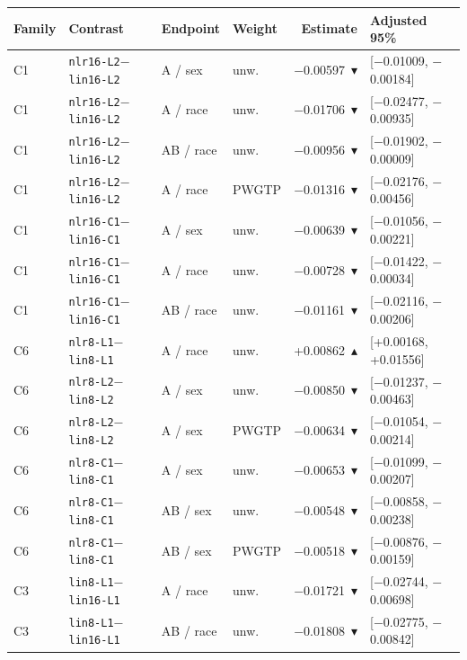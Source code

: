 \begin{tabular}{@{}llllrl@{}}
\toprule
Family & Contrast & Endpoint & Weight & Estimate & Adjusted 95\% \\
\midrule
C1 & \texttt{nlr16-L2}$-$\texttt{lin16-L2} & A / sex & unw. & $-$0.00597~$\blacktriangledown$ & [$-$0.01009, $-$0.00184] \\
C1 & \texttt{nlr16-L2}$-$\texttt{lin16-L2} & A / race & unw. & $-$0.01706~$\blacktriangledown$ & [$-$0.02477, $-$0.00935] \\
C1 & \texttt{nlr16-L2}$-$\texttt{lin16-L2} & AB / race & unw. & $-$0.00956~$\blacktriangledown$ & [$-$0.01902, $-$0.00009] \\
C1 & \texttt{nlr16-L2}$-$\texttt{lin16-L2} & A / race & PWGTP & $-$0.01316~$\blacktriangledown$ & [$-$0.02176, $-$0.00456] \\
C1 & \texttt{nlr16-C1}$-$\texttt{lin16-C1} & A / sex & unw. & $-$0.00639~$\blacktriangledown$ & [$-$0.01056, $-$0.00221] \\
C1 & \texttt{nlr16-C1}$-$\texttt{lin16-C1} & A / race & unw. & $-$0.00728~$\blacktriangledown$ & [$-$0.01422, $-$0.00034] \\
C1 & \texttt{nlr16-C1}$-$\texttt{lin16-C1} & AB / race & unw. & $-$0.01161~$\blacktriangledown$ & [$-$0.02116, $-$0.00206] \\
C6 & \texttt{nlr8-L1}$-$\texttt{lin8-L1} & A / race & unw. & +0.00862~$\blacktriangle$ & [+0.00168, +0.01556] \\
C6 & \texttt{nlr8-L2}$-$\texttt{lin8-L2} & A / sex & unw. & $-$0.00850~$\blacktriangledown$ & [$-$0.01237, $-$0.00463] \\
C6 & \texttt{nlr8-L2}$-$\texttt{lin8-L2} & A / sex & PWGTP & $-$0.00634~$\blacktriangledown$ & [$-$0.01054, $-$0.00214] \\
C6 & \texttt{nlr8-C1}$-$\texttt{lin8-C1} & A / sex & unw. & $-$0.00653~$\blacktriangledown$ & [$-$0.01099, $-$0.00207] \\
C6 & \texttt{nlr8-C1}$-$\texttt{lin8-C1} & AB / sex & unw. & $-$0.00548~$\blacktriangledown$ & [$-$0.00858, $-$0.00238] \\
C6 & \texttt{nlr8-C1}$-$\texttt{lin8-C1} & AB / sex & PWGTP & $-$0.00518~$\blacktriangledown$ & [$-$0.00876, $-$0.00159] \\
C3 & \texttt{lin8-L1}$-$\texttt{lin16-L1} & A / race & unw. & $-$0.01721~$\blacktriangledown$ & [$-$0.02744, $-$0.00698] \\
C3 & \texttt{lin8-L1}$-$\texttt{lin16-L1} & AB / race & unw. & $-$0.01808~$\blacktriangledown$ & [$-$0.02775, $-$0.00842] \\

\end{tabular}
